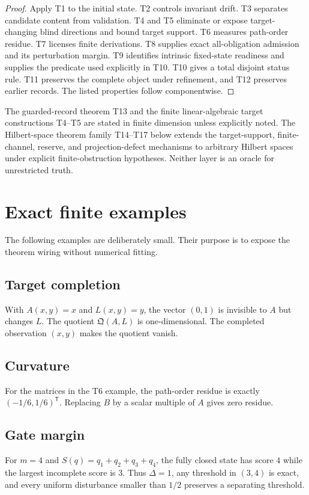\begin{proof}
Apply T1 to the initial state. T2 controls invariant drift. T3 separates candidate content from validation. T4 and T5 eliminate or expose target-changing blind directions and bound target support. T6 measures path-order residue. T7 licenses finite derivations. T8 supplies exact all-obligation admission and its perturbation margin. T9 identifies intrinsic fixed-state readiness and supplies the predicate used explicitly in T10. T10 gives a total disjoint status rule. T11 preserves the complete object under refinement, and T12 preserves earlier records. The listed properties follow componentwise.
\end{proof}

\begin{remark}
The guarded-record theorem T13 and the finite linear-algebraic target constructions T4--T5 are stated in finite dimension unless explicitly noted.  The Hilbert-space theorem family T14--T17 below extends the target-support, finite-channel, reserve, and projection-defect mechanisms to arbitrary Hilbert spaces under explicit finite-obstruction hypotheses.  Neither layer is an oracle for unrestricted truth.
\end{remark}

\section{Exact finite examples}

The following examples are deliberately small. Their purpose is to expose the theorem wiring without numerical fitting.

\subsection{Target completion}
With $A(x,y)=x$ and $L(x,y)=y$, the vector $(0,1)$ is invisible to $A$ but changes $L$. The quotient $\mathfrak Q(A,L)$ is one-dimensional. The completed observation $(x,y)$ makes the quotient vanish.

\subsection{Curvature}
For the matrices in the T6 example, the path-order residue is exactly $(-1/6,1/6)^{\mathsf T}$. Replacing $B$ by a scalar multiple of $A$ gives zero residue.

\subsection{Gate margin}
For $m=4$ and $S(q)=q_1+q_2+q_3+q_4$, the fully closed state has score $4$ while the largest incomplete score is $3$. Thus $\Delta=1$, any threshold in $(3,4)$ is exact, and every uniform disturbance smaller than $1/2$ preserves a separating threshold.

